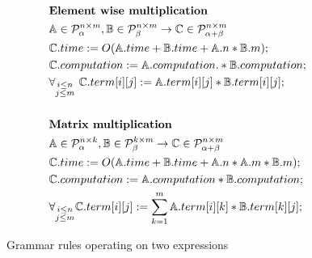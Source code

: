 \begin{figure}
\begin{framed}
\begin{align*}
&\text{{\bf Element wise multiplication}}\\
&\mathbb{A} \in \mathcal{P}^{n \times m}_\alpha, \mathbb{B} \in \mathcal{P}^{n \times m}_\beta \rightarrow \mathbb{C} \in \mathcal{P}^{n \times m}_{\alpha + \beta} \\
&\mathbb{C}.time := O(\mathbb{A}.time + \mathbb{B}.time + \mathbb{A}.n * \mathbb{B}.m);\\
&\mathbb{C}.computation := \mathbb{A}.computation .* \mathbb{B}.computation;\\
&\forall_{\substack{i \leq n\\j \leq m}}\text{ }\mathbb{C}.term[i][j] := \mathbb{A}.term[i][j] * \mathbb{B}.term[i][j];\\
& \\
&\text{{\bf Matrix multiplication}}\\
&\mathbb{A} \in \mathcal{P}^{n \times k}_\alpha, \mathbb{B} \in \mathcal{P}^{k \times m}_\beta \rightarrow \mathbb{C} \in \mathcal{P}^{n \times m}_{\alpha + \beta} \\
&\mathbb{C}.time := O(\mathbb{A}.time + \mathbb{B}.time + \mathbb{A}.n * \mathbb{A}.m * \mathbb{B}.m);\\
&\mathbb{C}.computation := \mathbb{A}.computation * \mathbb{B}.computation;\\
&\forall_{\substack{i \leq n\\j \leq m}}\mathbb{C}.term[i][j] := \sum_{k = 1}^m \mathbb{A}.term[i][k] * \mathbb{B}.term[k][j];
\end{align*}
\caption{Grammar rules operating on two expressions}
\label{fig:rules2}
\end{framed}
\end{figure}

